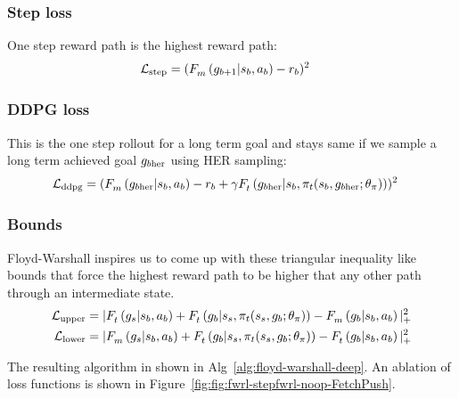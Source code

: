 \subsubsection{Step loss}
One step reward path is the highest reward path:
\begin{align}
      \Loss_{\text{step}} &= (\fwargs{\state_{b}}{\act_{b}}{\goal_{b+1}}{m}{} - \rew_b)^2
\end{align}
%

\subsubsection{DDPG loss}
This is the one step rollout for a long term goal and stays same if we sample a
long term achieved goal $\goal_{b\text{her}}$ using HER sampling:
\begin{align}
  \Loss_{\text{ddpg}} &= (\fwargs{\state_{b}}{\act_{b}}{\goal_{b\text{her}}}{m}{} -
      \rew_b + \discount\fwargs{\state_{b}}{\policy_t(\state_b, \goal_{b\text{her}};\param_\policy)}{\goal_{b\text{her}}}{t}{})^2
\end{align}
%

\subsubsection{Bounds}
Floyd-Warshall inspires us to come up with these triangular inequality like
bounds that force the highest reward path to be higher that any other path
through an intermediate state.
%
\begin{align}
  \Loss_{\text{upper}} &= |
      \fwargs{\state_{b}}{\act_b}{\goal_s}{t}{}
      + \fwargs{\state_{s}}{\policy_t(\state_s, \goal_{b};\param_\policy)}{\goal_b}{t}{}
      - \fwargs{\state_{b}}{\act_b}{\goal_b}{m}{}
      |_+^2
                         \\
  \Loss_{\text{lower}} &= |
      \fwargs{\state_{b}}{\act_b}{\goal_s}{m}{}
      + \fwargs{\state_{s}}{\policy_t(\state_s, \goal_{b};\param_\policy)}{\goal_b}{t}{}
      - \fwargs{\state_{b}}{\act_b}{\goal_b}{t}{}
      |_+^2
\end{align}%
% 

The resulting algorithm in shown in Alg~\ref{alg:floyd-warshall-deep}. An
ablation of loss functions is shown in Figure~\ref{fig:fig:fwrl-stepfwrl-noop-FetchPush}.




